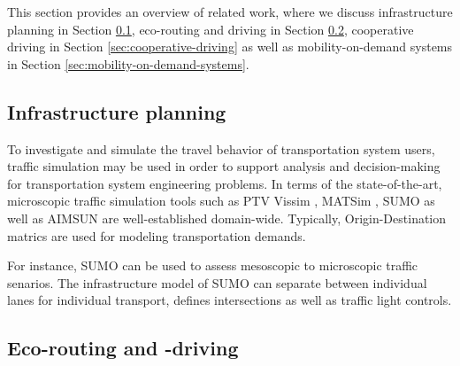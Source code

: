 \documentclass[a4paper,twoside]{article}
\begin{document}
	This section provides an overview of related work, where we discuss infrastructure planning in Section 	\ref{sec:infrastructure-planning}, eco-routing and driving in Section \ref{sec:eco-routing}, cooperative driving in Section \ref{sec:cooperative-driving} as well as mobility-on-demand systems in Section \ref{sec:mobility-on-demand-systems}.

%	
%
%	

	\subsection{Infrastructure planning}
\label{sec:infrastructure-planning}
	
	To investigate and simulate the travel behavior of transportation system users, traffic simulation may be used in order to support analysis and decision-making for transportation system engineering problems. In terms of the state-of-the-art, microscopic traffic simulation tools such as PTV Vissim \cite{fellendorf_vissim_1994}, MATSim \cite{w_axhausen_multi-agent_2016}, SUMO \cite{lopez_microscopic_2018} as well as AIMSUN \cite{barcelo2005dynamic} are well-established domain-wide. Typically, Origin-Destination matrics are used for modeling transportation demands.
	
	For instance, SUMO can be used to assess mesoscopic to microscopic traffic senarios. The infrastructure model of SUMO can separate between individual lanes for individual transport, defines intersections as well as traffic light controls. 
	

	\subsection{Eco-routing and -driving}
\label{sec:eco-routing}
\end{document}
